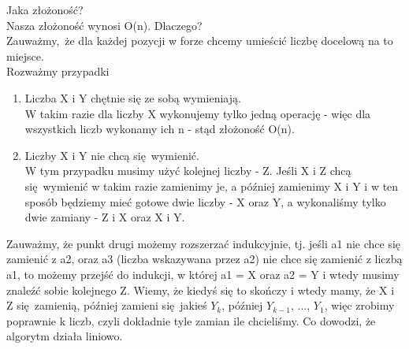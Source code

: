 \documentclass[12pt]{article}
\begin{document}
Jaka złożoność?\\
Nasza złożoność wynosi O(n). Dlaczego?\\
Zauważmy, że dla każdej pozycji w forze chcemy umieścić liczbę docelową na to miejsce. \\
Rozważmy przypadki\\
\begin{enumerate}
    \item Liczba X i Y chętnie się ze sobą wymieniają.\\
    W takim razie dla liczby X wykonujemy tylko jedną operację - więc dla wszystkich liczb wykonamy ich n - stąd złożoność O(n).
    \item Liczby X i Y nie chcą się wymienić.\\
    W tym przypadku musimy użyć kolejnej liczby - Z. Jeśli X i Z chcą się wymienić w takim razie zamienimy je, a później zamienimy X i Y i w ten sposób będziemy mieć gotowe dwie liczby - X oraz Y, a wykonaliśmy tylko dwie zamiany - Z i X oraz X i Y.\\
\end{enumerate}

Zauważmy, że punkt drugi możemy rozszerzać indukcyjnie, tj. jeśli a1 nie chce się zamienić z a2, oraz a3 (liczba wskazywana przez a2) nie chce się zamienić z liczbą a1, to możemy przejść do indukcji, w której a1 = X oraz a2 = Y i wtedy musimy znaleźć sobie kolejnego Z. Wiemy, że kiedyś się to skończy i wtedy mamy, że X i Z się zamienią, później zamieni się jakieś $Y_k$, później $Y_{k-1}$, ..., $Y_1$, więc zrobimy poprawnie k liczb, czyli dokładnie tyle zamian ile chcieliśmy. 
Co dowodzi, że algorytm działa liniowo.
\end{document}
